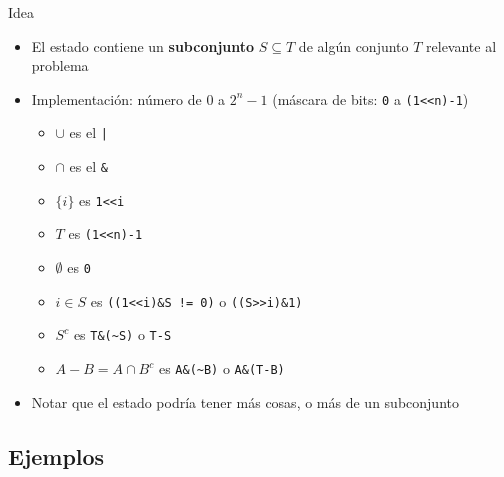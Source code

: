 \documentclass{beamer}
\begin{document}
\begin{frame}{Idea}
\begin{itemize}
    \item El estado contiene un \textbf{subconjunto} $S \subseteq T$ de algún conjunto $T$ relevante al problema
    \item Implementación: número de $0$ a $2^n-1$ (máscara de bits: \texttt{0} a \texttt{(1<<n)-1})
       \begin{itemize}
		   \item $\cup$ es el \texttt{|}
		   \item $\cap$ es el \texttt{\&}
		   \item $\{ i \}$ es \texttt{1<<i}
		   \item $T$ es \texttt{(1<<n)-1}
		   \item $\emptyset$ es \texttt{0}
           \item $i \in S$ es \texttt{((1<<i)\&S != 0)} o \texttt{((S>>i)\&1)}
		   \item $S^c$ es \texttt{T\&(\textasciitilde S)} o \texttt{T-S}
		   \item $A - B = A \cap B^c$ es \texttt{A\&(\textasciitilde B)} o \texttt{A\&(T-B)}
       \end{itemize}
    \item Notar que el estado podría tener más cosas, o más de un subconjunto
\end{itemize}
\end{frame}

\subsection{Ejemplos}
\end{document}
